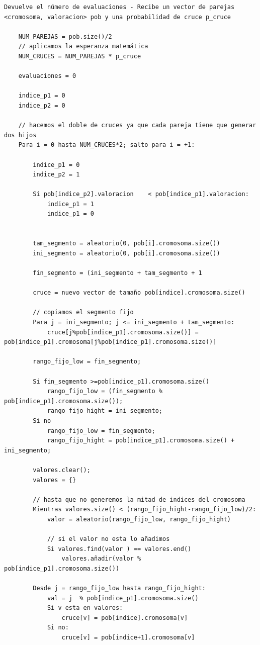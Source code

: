 \documentclass[12pt, spanish]{article}
\begin{document}
\begin{lstlisting}
Devuelve el número de evaluaciones - Recibe un vector de parejas <cromosoma, valoracion> pob y una probabilidad de cruce p_cruce

	NUM_PAREJAS = pob.size()/2
	// aplicamos la esperanza matemática
	NUM_CRUCES = NUM_PAREJAS * p_cruce
	
	evaluaciones = 0
	
	indice_p1 = 0
	indice_p2 = 0
	
	// hacemos el doble de cruces ya que cada pareja tiene que generar dos hijos	
	Para i = 0 hasta NUM_CRUCES*2; salto para i = +1:
	
		indice_p1 = 0
		indice_p2 = 1	
	
		Si pob[indice_p2].valoracion	< pob[indice_p1].valoracion:
			indice_p1 = 1
			indice_p1 = 0
	
	
		tam_segmento = aleatorio(0, pob[i].cromosoma.size())
		ini_segmento = aleatorio(0, pob[i].cromosoma.size())
		
		fin_segmento = (ini_segmento + tam_segmento + 1
	
		cruce = nuevo vector de tamaño pob[indice].cromosoma.size()
	
		// copiamos el segmento fijo
		Para j = ini_segmento; j <= ini_segmento + tam_segmento:
			cruce[j%pob[indice_p1].cromosoma.size()] = pob[indice_p1].cromosoma[j%pob[indice_p1].cromosoma.size()]
	
		rango_fijo_low = fin_segmento;

		Si fin_segmento >=pob[indice_p1].cromosoma.size()
			rango_fijo_low = (fin_segmento % pob[indice_p1].cromosoma.size());
			rango_fijo_hight = ini_segmento;
		Si no
			rango_fijo_low = fin_segmento;
			rango_fijo_hight = pob[indice_p1].cromosoma.size() + ini_segmento;

		valores.clear();
		valores = {}

		// hasta que no generemos la mitad de indices del cromosoma		
		Mientras valores.size() < (rango_fijo_hight-rango_fijo_low)/2:
			valor = aleatorio(rango_fijo_low, rango_fijo_hight)
			
			// si el valor no esta lo añadimos
			Si valores.find(valor ) == valores.end() 
				valores.añadir(valor % pob[indice_p1].cromosoma.size())
		
		Desde j = rango_fijo_low hasta rango_fijo_hight:
			val = j  % pob[indice_p1].cromosoma.size()
			Si v esta en valores:
				cruce[v] = pob[indice].cromosoma[v]
			Si no:
				cruce[v] = pob[indice+1].cromosoma[v]
				

\end{lstlisting}
\end{document}
